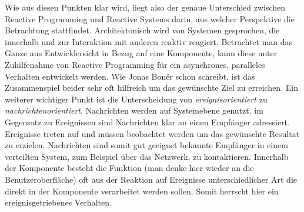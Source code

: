 Wie aus diesen Punkten klar wird, liegt also der genaue Unterschied zwischen Reactive Programming und Reactive Systems darin, aus welcher Perspektive die Betrachtung stattfindet. Architektonisch wird von Systemen gesprochen, die innerhalb und zur Interaktion mit anderen reaktiv reagiert. Betrachtet man das Ganze aus Entwicklersicht in Bezug auf eine Komponente, kann diese unter Zuhilfenahme von Reactive Programming für ein asynchrones, paralleles Verhalten entwickelt werden. Wie Jonas Bonér schon schreibt, ist das Zusammenspiel beider sehr oft hilfreich um das gewünschte Ziel zu erreichen. Ein weiterer wichtiger Punkt ist die Unterscheidung von \textit{ereignisorientiert} zu \textit{nachrichtenorientiert}. Nachrichten werden auf Systemebene genutzt. im Gegensatz zu Ereignissen sind Nachrichten klar an einen Empfänger adressiert. Ereignisse treten auf und müssen beobachtet werden um das gewünschte Resultat zu erzielen. Nachrichten sind somit gut geeignet bekannte Empfänger in einem verteilten System, zum Beispiel über das Netzwerk, zu kontaktieren. Innerhalb der Komponente besteht die Funktion (man denke hier wieder an die Benutzeroberfläche) oft aus der Reaktion auf Ereignisse unterschiedlicher Art die direkt in der Komponente verarbeitet werden sollen. Somit herrscht hier ein ereignisgetriebenes Verhalten. 

